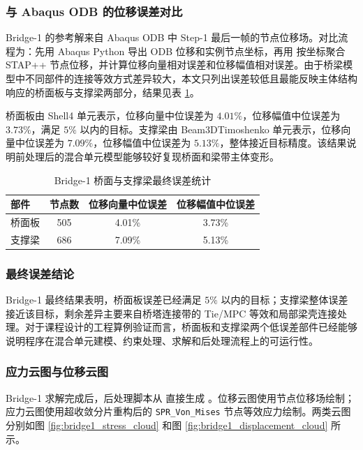 \documentclass[UTF8,a4paper,zihao=-4]{ctexart}
\begin{document}
\subsubsection{与 Abaqus ODB 的位移误差对比}

Bridge-1 的参考解来自 Abaqus ODB 中 Step-1 最后一帧的节点位移场。对比流程为：先用 Abaqus Python 导出 ODB 位移和实例节点坐标，再用  按坐标聚合 STAP++ 节点位移，并计算位移向量相对误差和位移幅值相对误差。由于桥梁模型中不同部件的连接等效方式差异较大，本文只列出误差较低且最能反映主体结构响应的桥面板与支撑梁两部分，结果见表 \ref{tab:bridge1_part_error}。

桥面板由 Shell4 单元表示，位移向量中位误差为 $4.01\%$，位移幅值中位误差为 $3.73\%$，满足 $5\%$ 以内的目标。支撑梁由 Beam3DTimoshenko 单元表示，位移向量中位误差为 $7.09\%$，位移幅值中位误差为 $5.13\%$，整体接近目标精度。该结果说明前处理后的混合单元模型能够较好复现桥面和梁带主体变形。

\begin{table}[H]
    \centering
    \caption{Bridge-1 桥面与支撑梁最终误差统计}
    \label{tab:bridge1_part_error}
    \begin{tabular}{lccc}
        \toprule
        部件 & 节点数 & 位移向量中位误差 & 位移幅值中位误差\\
        \midrule
        桥面板 & 505 & 4.01\% & 3.73\%\\
        支撑梁 & 686 & 7.09\% & 5.13\%\\
        \bottomrule
    \end{tabular}
\end{table}

\subsubsection{最终误差结论}

Bridge-1 最终结果表明，桥面板误差已经满足 $5\%$ 以内的目标；支撑梁整体误差接近该目标，剩余差异主要来自桥塔连接带的 Tie/MPC 等效和局部梁壳连接处理。对于课程设计的工程算例验证而言，桥面板和支撑梁两个低误差部件已经能够说明程序在混合单元建模、约束处理、求解和后处理流程上的可运行性。

\subsubsection{应力云图与位移云图}

Bridge-1 求解完成后，后处理脚本从  直接生成 。位移云图使用节点位移场绘制；应力云图使用超收敛分片重构后的 \texttt{SPR\_Von\_Mises} 节点等效应力绘制。两类云图分别如图 \ref{fig:bridge1_stress_cloud} 和图 \ref{fig:bridge1_displacement_cloud} 所示。
\end{document}
